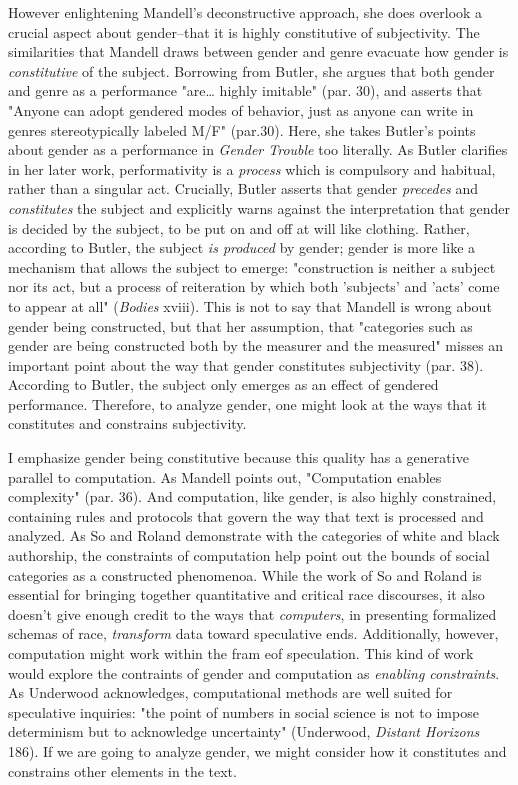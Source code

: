 \documentclass[11pt]{article}
\begin{document}
However enlightening Mandell's deconstructive approach, she does
overlook a crucial aspect about gender--that it is highly constitutive
of subjectivity. The similarities that Mandell draws between gender
and genre evacuate how gender is \emph{constitutive} of the
subject. Borrowing from Butler, she argues that both gender and genre
as a performance "are\ldots{} highly imitable" (par. 30), and asserts that
"Anyone can adopt gendered modes of behavior, just as anyone can write
in genres stereotypically labeled M/F" (par.30). Here, she takes
Butler's points about gender as a performance in \emph{Gender Trouble} too
literally. As Butler clarifies in her later work, performativity is a
\emph{process} which is compulsory and habitual, rather than a singular
act. Crucially, Butler asserts that gender \emph{precedes} and
\emph{constitutes} the subject and explicitly warns against the
interpretation that gender is decided by the subject, to be put on and
off at will like clothing. Rather, according to Butler, the subject
\emph{is produced} by gender; gender is more like a mechanism that allows
the subject to emerge: "construction is neither a subject nor its act,
but a process of reiteration by which both 'subjects' and 'acts' come
to appear at all" (\emph{Bodies} xviii). This is not to say that Mandell is
wrong about gender being constructed, but that her assumption, that
"categories such as gender are being constructed both by the measurer
and the measured" misses an important point about the way that gender
constitutes subjectivity (par. 38). According to Butler, the subject
only emerges as an effect of gendered performance. Therefore, to
analyze gender, one might look at the ways that it constitutes and
constrains subjectivity.

I emphasize gender being constitutive because this quality has a
generative parallel to computation. As Mandell points out,
"Computation enables complexity" (par. 36). And computation, like
gender, is also highly constrained, containing rules and protocols
that govern the way that text is processed and analyzed. As So and
Roland demonstrate with the categories of white and black authorship,
the constraints of computation help point out the bounds of social
categories as a constructed phenomenoa. While the work of So and
Roland is essential for bringing together quantitative and critical
race discourses, it also doesn't give enough credit to the ways that
\emph{computers}, in presenting formalized schemas of race, \emph{transform}
data toward speculative ends. Additionally, however, computation might
work within the fram eof speculation. This kind of work would explore
the contraints of gender and computation as \emph{enabling constraints}. As
Underwood acknowledges, computational methods are well suited for
speculative inquiries: "the point of numbers in social science is not
to impose determinism but to acknowledge uncertainty" (Underwood,
\emph{Distant Horizons} 186). If we are going to analyze gender, we might
consider how it constitutes and constrains other elements in the text.
\end{document}
